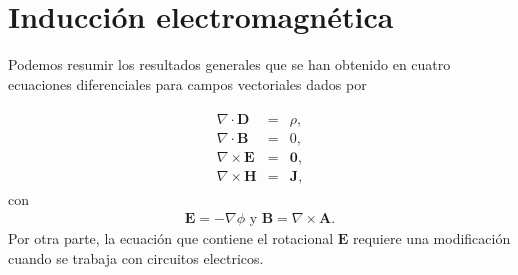 \chapter{Inducción electromagnética}
Podemos resumir los resultados generales que se han obtenido en cuatro ecuaciones diferenciales para campos vectoriales dados por

\begin{eqnarray}
	\label{ecs electrostatica}
	\begin{split}
		\nabla\cdot\textbf{D}&=&\rho,\\
		\nabla\cdot\textbf{B}&=&0,\\
		\nabla\times\textbf{E}&=&\textbf{0},\\
		\nabla\times\textbf{H}&=&\textbf{J},
	\end{split}
\end{eqnarray}
con
\begin{eqnarray}
	\textbf{E}=-\nabla\phi \,\,\mbox{y}\,\,\textbf{B}=\nabla\times\textbf{A}.\label{PotencialfA}
\end{eqnarray}
Por otra parte, la ecuación que contiene el rotacional $\textbf{E}$ requiere una modificación cuando se trabaja con circuitos electricos.


